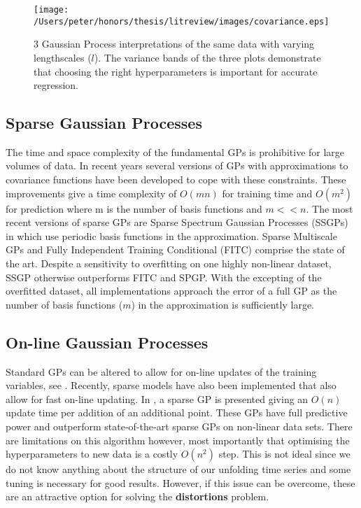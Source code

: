 	\begin{figure}[ht!]
	\centering
	\texttt{[image: /Users/peter/honors/thesis/litreview/images/covariance.eps]}
	\caption{3 Gaussian Process interpretations of the same data with varying lengthscales ($l$). The variance bands of the three plots demonstrate that choosing the right hyperparameters is important for accurate regression.}
	\label{gaussianprocesshyperparameters}
	\end{figure}
	

	
	\subsection{Sparse Gaussian Processes}
	The time and space complexity of the fundamental GPs is prohibitive for large volumes of data. In recent years several versions of GPs with approximations to covariance functions have been developed to cope with these constraints. These improvements give a time complexity of $O(mn)$ for training time and $O(m^{2})$ for prediction where m is the number of basis functions and $m << n$. The most recent versions of sparse GPs are Sparse Spectrum Gaussian Processes (SSGPs) in \citep{rasmussen2010ssgpr} which use periodic basis functions in the approximation. Sparse Multiscale GPs \citep{walder2008sparse} and Fully Independent Training Conditional (FITC) \citep{snelson2005sgppi} comprise the state of the art. Despite a sensitivity to overfitting on one highly non-linear dataset, SSGP otherwise outperforms FITC and SPGP. With the excepting of the overfitted dataset, all implementations approach the error of a full GP as the number of basis functions ($m$) in the approximation is sufficiently large.

	\subsection{On-line Gaussian Processes}
	Standard GPs can be altered to allow for on-line updates of the training variables, see \citep{osborne2007gaussian}. Recently, sparse models have also been implemented that also allow for fast on-line updating. In \citep{ranganathan2011online}, a sparse GP is presented giving an $O(n)$ update time per addition of an additional point. These GPs have full predictive power and outperform state-of-the-art sparse GPs on non-linear data sets. There are limitations on this algorithm however, most importantly that optimising the hyperparameters to new data is a costly $O(n^{2})$ step. This is not ideal since we do not know anything about the structure of our unfolding time series and some tuning is necessary for good results. However, if this issue can be overcome, these are an attractive option for solving the \textbf{distortions} problem.

